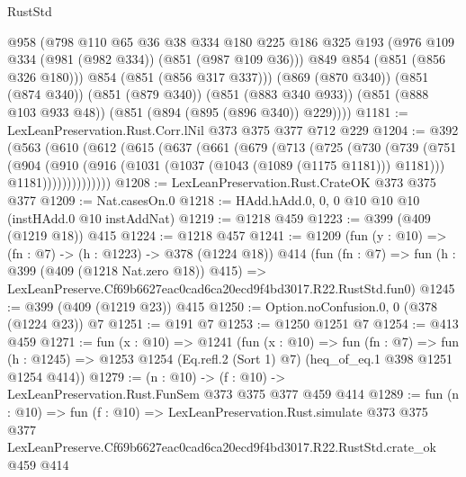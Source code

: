 \begin{lexlean}{RustStd}
\begin{coremodule}
          @958
          (@798
            @110
            @65
            @36
            @38
            @334
            @180
            @225
            @186
            @325
            @193
            (@976 @109 @334 (@981 (@982 @334)) (@851 (@987 @109 @36)))
            @849
            @854
            (@851 (@856 @326 @180)))
          @854
          (@851 (@856 @317 @337)))
        (@869 (@870 @340))
        (@851 (@874 @340))
        (@851 (@879 @340))
        (@851 (@883 @340 @933))
        (@851 (@888 @103 @933 @48))
        (@851 (@894 (@895 (@896 @340)) @229))))
@1181 := LexLeanPreservation.Rust.Corr.lNil @373 @375 @377 @712 @229
@1204 := @392
    (@563
      (@610
        (@612
          (@615
            (@637
              (@661
                (@679
                  (@713
                    (@725
                      (@730
                        (@739
                          (@751
                            (@904
                              (@910
                                (@916 (@1031 (@1037 (@1043 (@1089 (@1175 @1181))) @1181)))
                                @1181))))))))))))))
@1208 := LexLeanPreservation.Rust.CrateOK @373 @375 @377
@1209 := Nat.casesOn.{0}
@1218 := HAdd.hAdd.{0, 0, 0} @10 @10 @10 (instHAdd.{0} @10 instAddNat)
@1219 := @1218 @459
@1223 := @399 (@409 (@1219 @18)) @415
@1224 := @1218 @457
@1241 := @1209
    (fun (y : @10) => (fn : @7) -> (h : @1223) -> @378 (@1224 @18))
    @414
    (fun (fn : @7) =>
    fun (h : @399 (@409 (@1218 Nat.zero @18)) @415) =>
    LexLeanPreserve.Cf69b6627eac0cad6ca20ecd9f4bd3017.R22.RustStd.fun0)
@1245 := @399 (@409 (@1219 @23)) @415
@1250 := Option.noConfusion.{0, 0} (@378 (@1224 @23)) @7
@1251 := @191 @7
@1253 := @1250 @1251 @7
@1254 := @413 @459
@1271 := fun (x : @10) =>
  @1241
    (fun (x : @10) =>
    fun (fn : @7) =>
    fun (h : @1245) => @1253 @1254 (Eq.refl.{2} (Sort 1) @7) (heq_of_eq.{1} @398 @1251 @1254 @414))
@1279 := (n : @10) -> (f : @10) -> LexLeanPreservation.Rust.FunSem @373 @375 @377 @459 @414
@1289 := fun (n : @10) =>
  fun (f : @10) =>
  LexLeanPreservation.Rust.simulate
    @373
    @375
    @377
    LexLeanPreserve.Cf69b6627eac0cad6ca20ecd9f4bd3017.R22.RustStd.crate_ok
    @459
    @414
\end{coremodule}
\end{lexlean}
